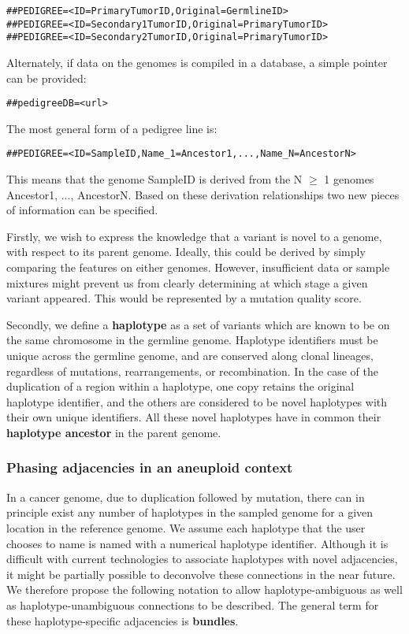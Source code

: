 \documentclass[8pt]{article}
\begin{document}
\begin{verbatim}
##PEDIGREE=<ID=PrimaryTumorID,Original=GermlineID>
##PEDIGREE=<ID=Secondary1TumorID,Original=PrimaryTumorID>
##PEDIGREE=<ID=Secondary2TumorID,Original=PrimaryTumorID>
\end{verbatim}

Alternately, if data on the genomes is compiled in a database, a simple pointer can be provided:

\begin{verbatim}
##pedigreeDB=<url>
\end{verbatim}

\begin{samepage}
The most general form of a pedigree line is:

\begin{verbatim}
##PEDIGREE=<ID=SampleID,Name_1=Ancestor1,...,Name_N=AncestorN>
\end{verbatim}
\end{samepage}

This means that the genome SampleID is derived from the N $\ge$ 1 genomes Ancestor1, ..., AncestorN.
Based on these derivation relationships two new pieces of information can be specified.

Firstly, we wish to express the knowledge that a variant is novel to a genome, with respect to its parent genome.
Ideally, this could be derived by simply comparing the features on either genomes.
However, insufficient data or sample mixtures might prevent us from clearly determining at which stage a given variant appeared. This would be represented by a mutation quality score.

Secondly, we define a \textbf{haplotype} as a set of variants which are known to be on the same chromosome in the germline genome.
Haplotype identifiers must be unique across the germline genome, and are conserved along clonal lineages, regardless of mutations, rearrangements, or recombination.
In the case of the duplication of a region within a haplotype, one copy retains the original haplotype identifier, and the others are considered to be novel haplotypes with their own unique identifiers.
All these novel haplotypes have in common their \textbf{haplotype ancestor} in the parent genome.

\subsubsection{Phasing adjacencies in an aneuploid context}
In a cancer genome, due to duplication followed by mutation, there can in principle exist any number of haplotypes in the sampled genome for a given location in the reference genome.
We assume each haplotype that the user chooses to name is named with a numerical haplotype identifier.
Although it is difficult with current technologies to associate haplotypes with novel adjacencies, it might be partially possible to deconvolve these connections in the near future.
We therefore propose the following notation to allow haplotype-ambiguous as well as haplotype-unambiguous connections to be described.
The general term for these haplotype-specific adjacencies is \textbf{bundles}.
\end{document}
